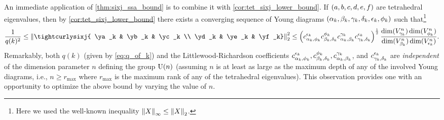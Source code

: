 \documentclass[notitlepage, 10pt]{article}
\begin{document}
An immediate application of \cref{thm:sixj_ssa_bound} is to combine it with \cref{cor:tet_sixj_lower_bound}.
If $(a,b,c,d,e,f)$ are tetrahedral eigenvalues, then by \cref{cor:tet_sixj_lower_bound} there exists a converging sequence of Young diagrams $(\alpha_k, \beta_k, \gamma_k, \delta_k, \epsilon_k, \phi_k)$ such that\footnote{Here we used the well-known inequality $\left\lVert X\right\rVert_{\infty} \leq \left\lVert X\right\rVert_{2}$.}
\begin{equation}
    \label{eq:combined_bound}
    \frac{1}{q(k)^2} \leq \norm{\tightcurlysixj{ \ya_k & \yb_k & \yc_k \\ \yd_k & \ye_k & \yf_k}}_{2}^2 \leq \left(c_{\ya_k,\yf_k}^{\ye_k}c_{\yb_k,\yd_k}^{\yf_k}c_{\ya_k,\yb_k}^{\yc_k}c_{\yc_k,\yd_k}^{\ye_k}\right)^{\frac{1}{2}} \frac{\dim(V_{\yc_k}^n) \dim(V_{\yf_k}^n)}{\dim(V_{\yb_k}^n) \dim(V_{\ye_k}^n)}.
\end{equation}
Remarkably, both $q(k)$ (given by \cref{eq:q_of_k}) and the Littlewood-Richardson coefficients $c_{\alpha_k,\phi_k}^{\epsilon_k}, c_{\beta_k,\delta_k}^{\phi_k}, c_{\alpha_k,\beta_k}^{\gamma_k}$, and $c_{\gamma_k,\delta_k}^{\epsilon_k}$ are \textit{independent} of the dimension parameter $n$ defining the group $\operatorname{U}(n)$ (assuming $n$ is at least as large as the maximum depth of any of the involved Young diagrams, i.e., $n \geq r_{\max}$ where $r_{\max}$ is the maximum rank of any of the tetrahedral eigenvalues).
This observation provides one with an opportunity to optimize the above bound by varying the value of $n$.
\end{document}
